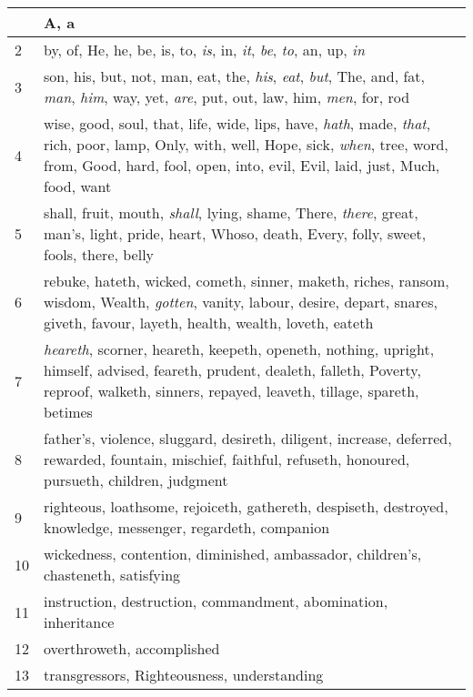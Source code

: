 \begin{center}
\begin{longtable}{l|p{3.75in}}
\hline \hline 
\endlastfoot 
1 & A, a\\ \hline 
2 & by, of, He, he, be, is, to, \emph{is}, in, \emph{it}, \emph{be}, \emph{to}, an, up, \emph{in}\\ \hline 
3 & son, his, but, not, man, eat, the, \emph{his}, \emph{eat}, \emph{but}, The, and, fat, \emph{man}, \emph{him}, way, yet, \emph{are}, put, out, law, him, \emph{men}, for, rod\\ \hline 
4 & wise, good, soul, that, life, wide, lips, have, \emph{hath}, made, \emph{that}, rich, poor, lamp, Only, with, well, Hope, sick, \emph{when}, tree, word, from, Good, hard, fool, open, into, evil, Evil, laid, just, Much, food, want\\ \hline 
5 & shall, fruit, mouth, \emph{shall}, lying, shame, There, \emph{there}, great, man's, light, pride, heart, Whoso, death, Every, folly, sweet, fools, there, belly\\ \hline 
6 & rebuke, hateth, wicked, cometh, sinner, maketh, riches, ransom, wisdom, Wealth, \emph{gotten}, vanity, labour, desire, depart, snares, giveth, favour, layeth, health, wealth, loveth, eateth\\ \hline 
7 & \emph{heareth}, scorner, heareth, keepeth, openeth, nothing, upright, himself, advised, feareth, prudent, dealeth, falleth, Poverty, reproof, walketh, sinners, repayed, leaveth, tillage, spareth, betimes\\ \hline 
8 & father's, violence, sluggard, desireth, diligent, increase, deferred, rewarded, fountain, mischief, faithful, refuseth, honoured, pursueth, children, judgment\\ \hline 
9 & righteous, loathsome, rejoiceth, gathereth, despiseth, destroyed, knowledge, messenger, regardeth, companion\\ \hline 
10 & wickedness, contention, diminished, ambassador, children's, chasteneth, satisfying\\ \hline 
11 & instruction, destruction, commandment, abomination, inheritance\\ \hline 
12 & overthroweth, accomplished\\ \hline 
13 & transgressors, Righteousness, understanding\\ \hline 
\end{longtable} 
\end{center} 




 
